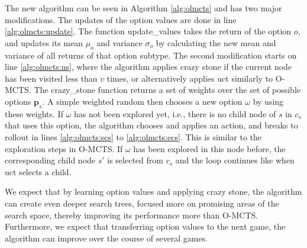 The new algorithm can be seen in Algorithm \ref{alg:olmcts} and has two major
modifications. The updates of the option values are done in line
\ref{alg:olmcts:update}. The function \textsf{update\_values} takes the return
of the option $o$, and updates its mean $\mu_o$ and variance $\sigma_o$ by
calculating the new mean and variance of all returns of that option subtype. The
second modification starts on line \ref{alg:olmcts:ns}, where the algorithm
applies crazy stone if the current node has been visited less than $v$ times, or
alternatively applies \textsf{uct} similarly to O-MCTS. The
\textsf{crazy\_stone} function returns a set of weights over the set of possible
options $\mathbf{p}_s$. A simple weighted random then chooses a new option
$\omega$ by using these weights.  If $\omega$ has not been explored yet, i.e.,
there is no child node of $s$ in $c_s$ that uses this option, the algorithm
chooses and applies an action, and breaks to rollout in lines
\ref{alg:olmcts:scs} to \ref{alg:olmcts:ecs}. This is similar to the exploration
steps in O-MCTS. If $\omega$ has been explored in this node before, the
corresponding child node $s'$ is selected from $c_s$ and the loop continues
like when \textsf{uct} selects a child.

We expect that by learning option values and applying crazy stone, the algorithm
can create even deeper search trees, focused more on promising areas of the
search space, thereby improving its performance more than O-MCTS. Furthermore,
we expect that transferring option values to the next game, the algorithm can
improve over the course of several games.
